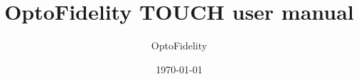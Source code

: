 \documentclass[confidential]{optodoc}
\author{OptoFidelity}
\date{\today}
\title{OptoFidelity TOUCH user manual}
\begin{document}
\maketitle
\tableofcontents












\begin{appendices}


\end{appendices}
\end{document}
